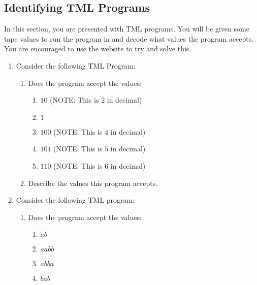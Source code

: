 \begin{appendices}
\begin{itemize}
\begin{figure}[H]
    \end{figure}
\end{itemize}

\subsection{Identifying TML Programs}
In this section, you are presented with TML programs. You will be given some tape values to run the program in and decode what values the program accepts. You are encouraged to use the website to try and solve this.

\begin{enumerate}
    \item Consider the following TML Program:
    

    \begin{enumerate}
        \item Does the program accept the values:
        \begin{enumerate}
            \item $10$ (NOTE: This is $2$ in decimal)
            \item $1$
            \item $100$ (NOTE: This is $4$ in decimal)
            \item $101$ (NOTE: This is $5$ in decimal)
            \item $110$ (NOTE: This is $6$ in decimal)
        \end{enumerate}
        \item Describe the values this program accepts.
    \end{enumerate}
    \newpage

    \item Consider the following TML program:
    
    \begin{enumerate}
        \item Does the program accept the values:
        \begin{enumerate}
            \item $ab$
            \item $aabb$
            \item $abba$
            \item $bab$
        \end{enumerate}
        

\end{enumerate}
\end{enumerate}
\end{appendices}
